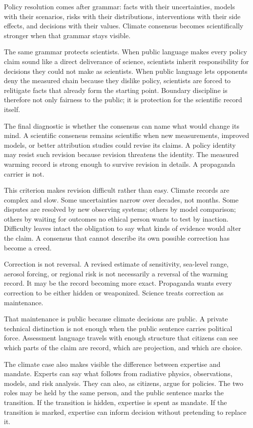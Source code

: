 Policy resolution comes after grammar: facts with their uncertainties,
models with their scenarios, risks with their distributions,
interventions with their side effects, and decisions with their values.
Climate consensus becomes scientifically stronger when that grammar
stays visible.

The same grammar protects scientists. When public language makes every
policy claim sound like a direct deliverance of science, scientists
inherit responsibility for decisions they could not make as
scientists. When public language lets opponents deny the measured chain
because they dislike policy, scientists are forced to relitigate facts
that already form the starting point. Boundary discipline is therefore
not only fairness to the public; it is protection for the scientific
record itself.

The final diagnostic is whether the consensus can name what would
change its mind. A scientific consensus remains scientific when new
measurements, improved models, or better attribution studies could
revise its claims. A policy identity may resist such revision because
revision threatens the identity. The measured warming record is strong
enough to survive revision in details. A propaganda carrier is not.

This criterion makes revision difficult rather than easy. Climate
records are complex and slow. Some uncertainties narrow over decades,
not months. Some disputes are resolved by new observing systems;
others by model comparison; others by waiting for outcomes no ethical
person wants to test by inaction. Difficulty leaves intact the
obligation to say what kinds of evidence would alter the claim. A
consensus that cannot describe its own possible correction has become
a creed.

Correction is not reversal. A revised estimate of sensitivity,
sea-level range, aerosol forcing, or regional risk is not necessarily
a reversal of the warming record. It may be the record becoming more
exact. Propaganda wants every correction to be either hidden or
weaponized. Science treats correction as maintenance.

That maintenance is public because climate decisions are public. A
private technical distinction is not enough when the public sentence
carries political force. Assessment language travels with enough
structure that citizens can see which parts of the claim are record,
which are projection, and which are choice.

The climate case also makes visible the difference between expertise
and mandate. Experts can say what follows from radiative physics,
observations, models, and risk analysis. They can also, as citizens,
argue for policies. The two roles may be held by the same person, and
the public sentence marks the transition. If the transition is hidden,
expertise is spent as mandate. If the transition is marked, expertise
can inform decision without pretending to replace it.

